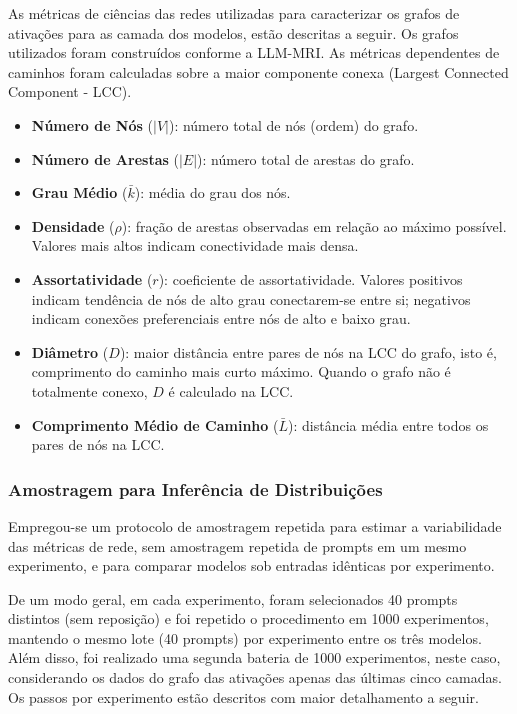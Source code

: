 As métricas de ciências das redes utilizadas para caracterizar os grafos de ativações para as camada dos modelos, estão descritas a seguir. Os grafos utilizados foram construídos conforme a LLM-MRI. As métricas dependentes de caminhos foram calculadas sobre a maior componente conexa (Largest Connected Component - LCC).

\begin{itemize}
    \item \textbf{Número de Nós} ($|V|$): número total de nós (ordem) do grafo.
    \item \textbf{Número de Arestas} ($|E|$): número total de arestas do grafo.
    \item \textbf{Grau Médio} ($\bar{k}$): média do grau dos nós.
    \item \textbf{Densidade} ($\rho$): fração de arestas observadas em relação ao máximo possível. Valores mais altos indicam conectividade mais densa.
    \item \textbf{Assortatividade} ($r$): coeficiente de assortatividade. Valores positivos indicam tendência de nós de alto grau conectarem-se entre si; negativos indicam conexões preferenciais entre nós de alto e baixo grau.
    \item \textbf{Diâmetro} ($D$): maior distância entre pares de nós na LCC do grafo, isto é, comprimento do caminho mais curto máximo. Quando o grafo não é totalmente conexo, $D$ é calculado na LCC.
    \item \textbf{Comprimento Médio de Caminho} ($\bar{L}$): distância média entre todos os pares de nós na LCC.
\end{itemize}

\subsubsection{Amostragem para Inferência de Distribuições}

Empregou-se um protocolo de amostragem repetida para estimar a variabilidade das métricas de rede, sem amostragem repetida de prompts em um mesmo experimento, e para comparar modelos sob entradas idênticas por experimento.

De um modo geral, em cada experimento, foram selecionados 40 prompts distintos (sem reposição) e foi repetido o procedimento em 1000 experimentos, mantendo o mesmo lote (40 prompts) por experimento entre os três modelos. Além disso, foi realizado uma segunda bateria de 1000 experimentos, neste caso, considerando os dados do grafo das ativações apenas das últimas cinco camadas. Os passos por experimento estão descritos com maior detalhamento a seguir.

